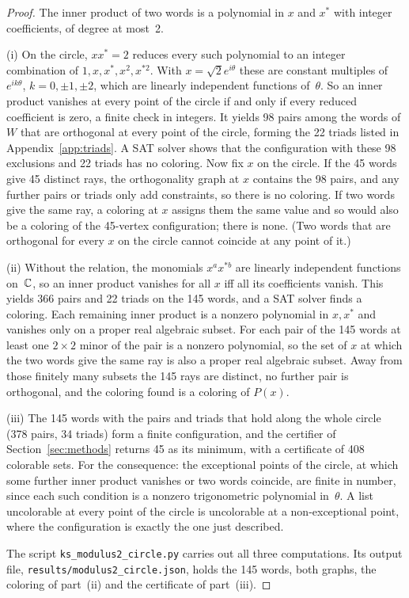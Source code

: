 \begin{proof}
The inner product of two words is a polynomial in $x$ and $x^{*}$ with integer coefficients, of
degree at most~2.

(i)  On the circle, $xx^{*}=2$ reduces every such polynomial to an integer combination of
$1,x,x^{*},x^2,x^{*2}$.  With $x=\sqrt2e^{i\theta}$ these are constant multiples of
$e^{ik\theta}$, $k=0,\pm1,\pm2$, which are linearly independent functions of~$\theta$.  So an
inner product vanishes at every point of the circle if and only if every reduced coefficient is
zero, a finite check in integers.  It yields 98 pairs among the words of $W$ that are orthogonal
at every point of the circle, forming the 22 triads listed in Appendix~\ref{app:triads}.  A SAT
solver shows that the configuration with these 98 exclusions and 22 triads has no coloring.  Now
fix $x$ on the circle.  If the 45 words give 45 distinct rays, the orthogonality graph at $x$
contains the 98 pairs, and any further pairs or triads only add constraints, so there is no
coloring.  If two words give the same ray, a coloring at $x$ assigns them the same value and so
would also be a coloring of the 45-vertex configuration; there is none.  (Two words that are
orthogonal for every $x$ on the circle cannot coincide at any point of it.)

(ii)  Without the relation, the monomials $x^ax^{*b}$ are linearly independent functions
on~$\mathbb{C}$, so an inner product vanishes for all $x$ iff all its coefficients vanish.  This yields
366 pairs and 22 triads on the 145 words, and a SAT solver finds a coloring.  Each remaining
inner product is a nonzero polynomial in $x,x^{*}$ and vanishes only on a proper real algebraic
subset.  For each pair of the 145 words at least one $2\times2$ minor of the pair is a nonzero
polynomial, so the set of $x$ at which the two words give the same ray is also a proper real
algebraic subset.  Away from those finitely many subsets the 145 rays are distinct, no further
pair is orthogonal, and the coloring found is a coloring of $P(x)$.

(iii)  The 145 words with the pairs and triads that hold along the whole circle (378 pairs, 34
triads) form a finite configuration, and the certifier of Section~\ref{sec:methods} returns 45 as
its minimum, with a certificate of 408 colorable sets.  For the consequence: the exceptional
points of the circle, at which some further inner product vanishes or two words coincide, are
finite in number, since each such condition is a nonzero trigonometric polynomial in~$\theta$.
A list uncolorable at every point of the circle is uncolorable at a non-exceptional point, where
the configuration is exactly the one just described.

The script \texttt{ks\_modulus2\_circle.py} carries out all three computations.  Its
output file, \texttt{results/modulus2\_circle.json}, holds the 145 words, both graphs, the
coloring of part~(ii) and the certificate of part~(iii).
\end{proof}

